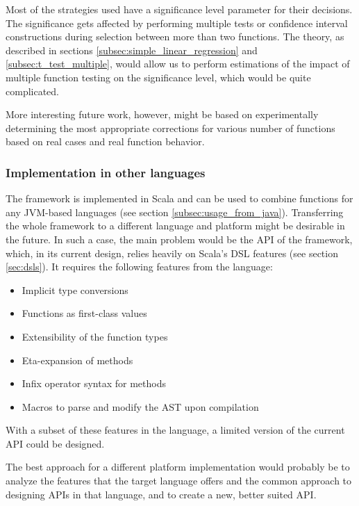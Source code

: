 Most of the strategies used have a significance level parameter for their decisions. The significance gets affected by performing multiple tests or confidence interval constructions during selection between more than two functions. The theory, as described in sections \ref{subsec:simple_linear_regression} and \ref{subsec:t_test_multiple}, would allow us to perform estimations of the impact of multiple function testing on the significance level, which would be quite complicated. 

More interesting future work, however, might be based on experimentally determining the most appropriate corrections for various number of functions based on real cases and real function behavior.

\subsubsection{Implementation in other languages}

The framework is implemented in Scala and can be used to combine functions for any JVM-based languages (see section \ref{subsec:usage_from_java}). Transferring the whole framework to a different language and platform might be desirable in the future. In such a case, the main problem would be the API of the framework, which, in its current design, relies heavily on Scala's DSL features (see section \ref{sec:dsls}). It requires the following features from the language:

\begin{itemize}
	\item Implicit type conversions
	\item Functions as first-class values
	\item Extensibility of the function types
	\item Eta-expansion of methods
	\item Infix operator syntax for methods
	\item Macros to parse and modify the AST upon compilation
\end{itemize}

With a subset of these features in the language, a limited version of the current API could be designed. 

The best approach for a different platform implementation would probably be to analyze the features that the target language offers and the common approach to designing APIs in that language, and to create a new, better suited API.